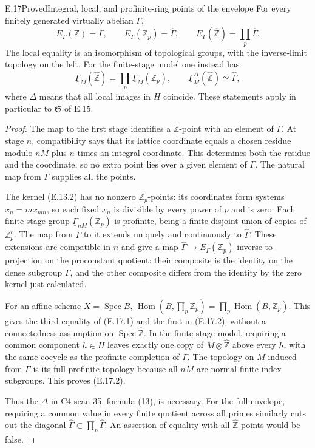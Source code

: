 \begin{statement}{E.17}{Proved}{Integral, local, and profinite-ring points of the envelope}
For every finitely generated virtually abelian \(\Gamma\),
\[
 E_\Gamma(\mathbb Z)=\Gamma,\qquad
 E_\Gamma(\mathbb Z_p)=\widehat\Gamma,
 \qquad
 E_\Gamma(\widehat{\mathbb Z})=\prod_p\widehat\Gamma.              \tag{E.17.1}
\]
The local equality is an isomorphism of topological groups, with
the inverse-limit topology on the left.  For the finite-stage
model one instead has
\[
 \underline\Gamma_M(\widehat{\mathbb Z})
       =\prod_p\underline\Gamma_M(\mathbb Z_p),\qquad
 \underline\Gamma_M^{\Delta}(\widehat{\mathbb Z})
       \simeq\widehat\Gamma,                                  \tag{E.17.2}
\]
where \(\Delta\) means that all local images in \(H\) coincide.
These statements apply in particular to \(\mathfrak S\) of E.15.
\end{statement}
\begin{proof}
The map to the first stage identifies a \(\mathbb Z\)-point with
an element of \(\Gamma\).  At stage \(n\), compatibility says
that its lattice coordinate equals a chosen residue modulo
\(nM\) plus \(n\) times an integral coordinate.  This determines
both the residue and the coordinate, so no extra point lies
over a given element of \(\Gamma\).  The natural map from
\(\Gamma\) supplies all the points.

The kernel (E.13.2) has no nonzero \(\mathbb Z_p\)-points:
its coordinates form systems \(x_n=mx_{mn}\), so each fixed
\(x_n\) is divisible by every power of \(p\) and is zero.
Each finite-stage group \(\underline\Gamma_{nM}(\mathbb Z_p)\)
is profinite, being a finite disjoint union of copies of
\(\mathbb Z_p^r\).  The map from \(\Gamma\) to it extends uniquely
and continuously to \(\widehat\Gamma\).  These extensions are
compatible in \(n\) and give a map
\(\widehat\Gamma\to E_\Gamma(\mathbb Z_p)\) inverse to projection
on the proconstant quotient: their composite is the identity
on the dense subgroup \(\Gamma\), and the other composite
differs from the identity by the zero kernel just calculated.

For an affine scheme \(X=\operatorname{Spec}B\),
\(\operatorname{Hom}(B,\prod_p\mathbb Z_p)
 =\prod_p\operatorname{Hom}(B,\mathbb Z_p)\).
This gives the third equality of (E.17.1) and the first in
(E.17.2), without a connectedness assumption on
\(\operatorname{Spec}\widehat{\mathbb Z}\).  In the finite-stage
model, requiring a common component \(h\in H\) leaves exactly
one copy of \(M\otimes\widehat{\mathbb Z}\) above every \(h\),
with the same cocycle as the profinite completion of \(\Gamma\).
The topology on \(M\) induced from \(\Gamma\) is its full
profinite topology because all \(nM\) are normal finite-index
subgroups.  This proves (E.17.2).

Thus the \(\Delta\) in C4 scan 35, formula (13), is necessary.
For the full envelope, requiring a common value in every finite
quotient across all primes similarly cuts out the diagonal
\(\widehat\Gamma\subset\prod_p\widehat\Gamma\).
An assertion of equality with all
\(\widehat{\mathbb Z}\)-points would be false.
\end{proof}

